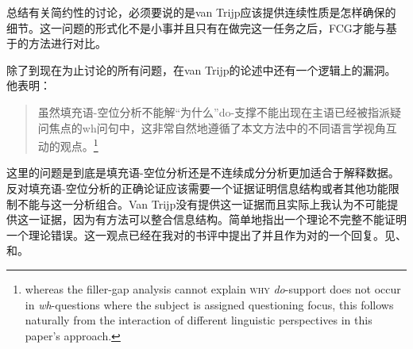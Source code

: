 总结有关简约性的讨论，必须要说的是van Trijp应该提供连续性质是怎样确保的细节。这一问题的形式化不是小事并且只有在做完这一任务之后，FCG才能与基于\slaschc 的方法进行对比。

除了到现在为止讨论的所有问题，在van Trijp的论述中还有一个逻辑上的漏洞。他表明：
\begin{quotation}
虽然填充语-空位分析不能解“为什么”do-支撑不能出现在主语已经被指派疑问焦点的wh问句中，这非常自然地遵循了本文方法中的不同语言学视角互动的观点。\citep[]{vanTrijp2014a}\footnote{%
whereas the filler-gap analysis cannot explain \textsc{why} \emph{do}-support does not occur
  in \emph{wh}-questions where the subject is assigned questioning focus, this follows naturally
from the interaction of different linguistic perspectives in this paper's
approach.}
\end{quotation}
这里的问题是到底是填充语-空位分析还是不连续成分分析更加适合于解释数据。反对填充语-空位分析的正确论证应该需要一个证据证明信息结构或者其他功能限制不能与这一分析组合。Van Trijp没有提供这一证据而且实际上我认为不可能提供这一证据，因为有方法可以整合信息结构。简单地指出一个理论不完整不能证明一个理论错误。这一观点已经在我对的书评中提出了并且作为对\citet{Boas2014a}的一个回复。见、和。


